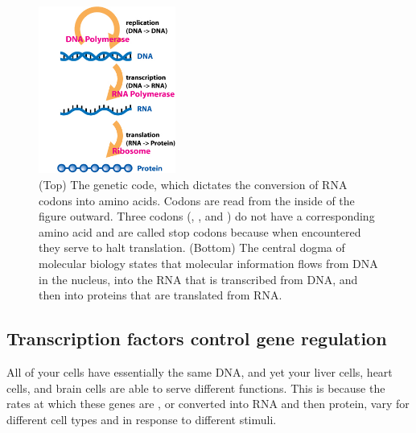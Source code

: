 \begin{figure}[hp]
\vspace{8ex}

\includegraphics[width = 0.4\textwidth]{../images/Central_Dogma_of_Molecular_Biochemistry_with_Enzymes.jpg}
\caption{(Top) The genetic code, which dictates the conversion of RNA codons into amino acids. Codons are read from the inside of the figure outward. Three codons (, , and ) do not have a corresponding amino acid and are called stop codons because when encountered they serve to halt translation. (Bottom) The central dogma of molecular biology states that molecular information flows from DNA in the nucleus, into the RNA that is transcribed from DNA, and then into proteins that are translated from RNA.}
\label{fig:central_dogma}
\end{figure}


\subsection{Transcription factors control gene regulation}

All of your cells have essentially the same DNA, and yet your liver cells, heart cells, and brain cells are able to serve different functions. This is because the rates at which these genes are , or converted into RNA and then protein, vary for different cell types and in response to different stimuli.


